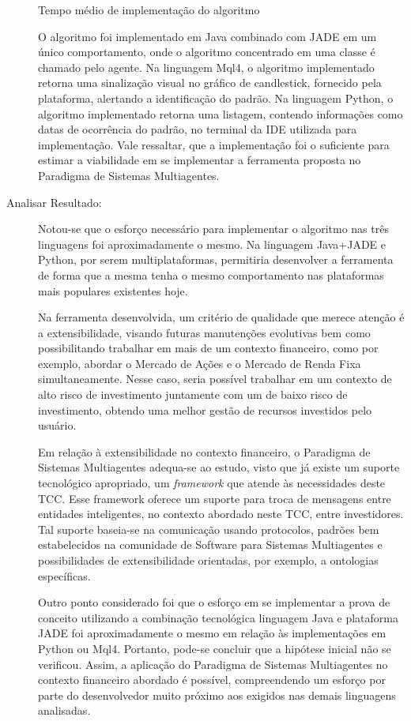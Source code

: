 \begin{description}
\begin{table}[h]
	\caption{Tempo médio de implementação do algoritmo}
\end{table}

O algoritmo foi implementado em Java combinado com JADE em um único comportamento, onde o algoritmo concentrado em uma classe é chamado pelo agente. Na linguagem Mql4, o algoritmo implementado retorna uma sinalização visual no gráfico de candlestick, fornecido pela plataforma, alertando a identificação do padrão. Na linguagem Python, o algoritmo implementado retorna uma listagem, contendo informações como datas de ocorrência do padrão, no terminal da IDE utilizada para implementação. Vale ressaltar, que a implementação foi o suficiente para estimar a viabilidade em se implementar a ferramenta proposta no Paradigma de Sistemas Multiagentes.

\item [Analisar Resultado:]
Notou-se que o esforço necessário para implementar o algoritmo nas três linguagens foi aproximadamente o mesmo. Na linguagem Java+JADE e Python, por serem multiplataformas, permitiria desenvolver a ferramenta de forma que a mesma tenha o mesmo comportamento nas plataformas mais populares existentes hoje.

Na ferramenta desenvolvida, um critério de qualidade que merece atenção é a extensibilidade, visando futuras manutenções evolutivas bem como possibilitando trabalhar em mais de um contexto financeiro, como por exemplo, abordar o Mercado de Ações e o Mercado de Renda Fixa simultaneamente. Nesse caso, seria possível trabalhar em um contexto de alto risco de investimento juntamente com um de baixo risco de investimento, obtendo uma melhor gestão de recursos investidos pelo usuário.

Em relação à extensibilidade no contexto financeiro, o Paradigma de Sistemas Multiagentes adequa-se ao estudo, visto que já existe um suporte tecnológico apropriado, um \textit{framework} que atende às necessidades deste TCC. Esse framework oferece um suporte para troca de mensagens entre entidades inteligentes, no contexto abordado neste TCC, entre investidores. Tal suporte baseia-se na comunicação usando protocolos, padrões bem estabelecidos na comunidade de Software para Sistemas Multiagentes e possibilidades de extensibilidade orientadas, por exemplo, a ontologias específicas.

Outro ponto considerado foi que o esforço em se implementar a prova de conceito utilizando a combinação tecnológica linguagem Java e plataforma JADE foi aproximadamente o mesmo em relação às implementações em Python ou Mql4. Portanto, pode-se concluir que a hipótese inicial não se verificou. Assim, a aplicação do Paradigma de Sistemas Multiagentes no contexto financeiro abordado é possível, compreendendo um esforço por parte do desenvolvedor muito próximo aos exigidos nas demais linguagens analisadas.


\end{description}
